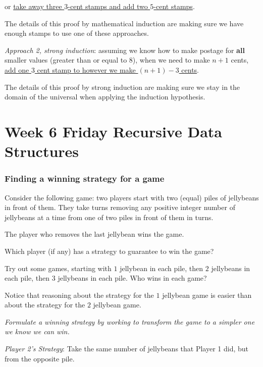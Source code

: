\documentclass[12pt, oneside]{article}
\begin{document}
\vspace{-10pt}
or \underline{take away three $3$-cent stamps and add two $5$-cent stamps}.

\vspace{-10pt}
The details of this proof by mathematical induction
are making sure we have enough 
stamps to use one of these approaches.

{\it Approach 2, strong induction}: assuming we know how to make postage
for {\bf all} smaller values (greater than or equal to $8$), when
we need to make $n+1$ cents, \underline{add one $3$ cent stamp to 
however we make $(n+1) - 3$ cents}.

\vspace{-10pt}
The details of this proof by strong induction are making sure we 
stay in the domain of the universal when applying the induction hypothesis.
 \newpage

\section*{Week 6 Friday Recursive Data Structures}

\subsubsection*{Finding a winning strategy for a game}


Consider the following game: two players start with 
two (equal) piles of jellybeans in front of them.
They take turns removing any positive integer number
of jellybeans at a time from one of two piles in 
front of them in turns.

The player who removes the last jellybean wins the game.

Which player (if any) has a strategy to guarantee
to win the game?


Try out some games, starting with $1$ jellybean in each pile,
then $2$ jellybeans in each pile, then $3$ jellybeans in each pile.
Who wins in each game?

\vspace{200pt}


Notice that reasoning about the strategy for the $1$ jellybean 
game is easier than about the strategy for the $2$ jellybean game.

{\it Formulate a winning strategy by working to 
transform the game to a simpler one we know we can win.}

\newpage

{\it Player 2's Strategy}: Take the same number of jellybeans that Player 1 did, 
but from the opposite pile. 
\end{document}
